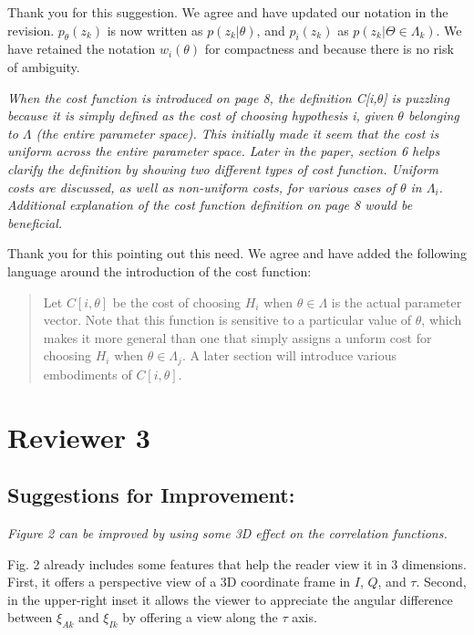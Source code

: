 \documentclass[12pt]{report}
\begin{document}
  
  {{ Thank you for this suggestion.  We agree and have
        updated our notation in the revision.  $p_\theta(z_k)$ is now written
        as $p(z_k | \theta)$, and $p_i(z_k)$ as $p(z_k | \Theta \in
        \Lambda_k)$.  We have retained the notation $w_i(\theta)$ for
        compactness and because there is no risk of ambiguity. }}
  

{\textit{When the cost function is introduced on page 8, the
      definition C[i,$\theta$] is puzzling because it is simply defined
      as the cost of choosing hypothesis i, given $\theta$ belonging to
      $\Lambda$ (the entire parameter space). This initially made it
      seem that the cost is uniform across the entire parameter
      space. Later in the paper, section 6 helps clarify the definition
      by showing two different types of cost function. Uniform costs are
      discussed, as well as non-uniform costs, for various cases of
      $\theta$ in $\Lambda_i$. Additional explanation of the cost
      function definition on page 8 would be beneficial. }}

  
    Thank you for this pointing out this need.  We agree and have added
    the following language around the introduction of the cost function:

        \begin{quotation}
          Let $C[i,{\theta}]$ be the cost of choosing $H_i$ when
          ${\theta} \in \Lambda$ is the actual parameter vector.  Note that
          this function is sensitive to a particular value of $\theta$, which
          makes it more general than one that simply assigns a unform cost for
          choosing $H_i$ when $\theta \in \Lambda_j$.  A later section will
          introduce various embodiments of $C[i,{\theta}]$.
        \end{quotation}
  


\section*{Reviewer 3}
\subsection*{Suggestions for Improvement:}

{\textit{Figure 2 can be improved by using some 3D effect on the
      correlation functions.}}

  
   Fig. 2 already includes some features that help the reader view it in
    3 dimensions.  First, it offers a perspective view of a 3D coordinate
    frame in $I$, $Q$, and $\tau$.  Second, in the upper-right inset it allows
    the viewer to appreciate the angular difference between $\xi_{Ak}$ and
    $\xi_{Ik}$ by offering a view along the $\tau$ axis.
  
\end{document}
